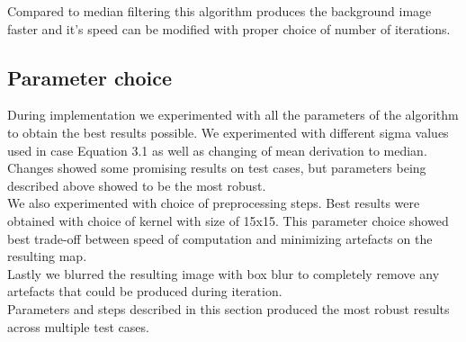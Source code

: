 \documentclass[12pt, a4paper, oneside]{book}
\begin{document}
Compared to median filtering this algorithm produces the background image faster and it's speed can be modified with proper choice of number of iterations.

\subsection{Parameter choice}
During implementation we experimented with all the parameters of the algorithm to obtain the best results possible.
We experimented with different sigma values used in case Equation 3.1 as well as changing of mean derivation to median.
Changes showed some promising results on test cases, but parameters being described above showed to be the most robust.\\
We also experimented with choice of preprocessing steps.
Best results were obtained with choice of kernel with size of 15x15.
This parameter choice showed best trade-off between speed of computation and minimizing artefacts on the resulting map.\\
Lastly we blurred the resulting image with box blur to completely remove any artefacts that could be produced during iteration.\\
Parameters and steps described in this section produced the most robust results across multiple test cases.
\end{document}
